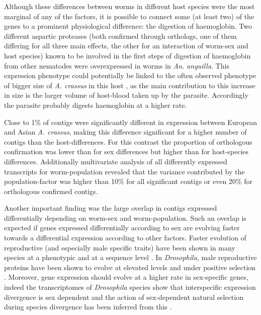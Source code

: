 Although these differences between worms in different host species
were the most marginal of any of the factors, it is possible to
connect some (at least two) of the genes to a prominent physiological
difference: the digestion of haemoglobin. Two different aspartic
proteases (both confirmed through orthologs, one of them differing for
all three main effects, the other for an interaction of worm-sex and
host species) known to be involved in the first steps of digestion of
haemoglobin from other nematodes \cite{pmid12782060} were
overexpressed in worms in \textit{An. anguilla}. This expression
phenotype could potentially be linked to the often observed phenotype
of bigger size of \textit{A. crassus} in this host
\cite{knopf_swimbladder_2006}, as the main contribution to this
increase in size is the larger volume of host-blood taken up by the
parasite. Accordingly the parasite probably digests haemoglobin at a
higher rate.

Close to 1\% of contigs were significantly different in expression
between European and Asian \textit{A. crassus}, making this difference
significant for a higher number of contigs than the
host-differences. For this contrast the proportion of orthologous
confirmation was lower than for sex differences but higher than for
host-species differences. Additionally multivariate analysis of all
differently expressed transcripts for worm-population revealed that
the variance contributed by the population-factor was higher than 10\%
for all significant contigs or even 20\% for orthologous confirmed
contigs.

Another important finding was the large overlap in contigs expressed
differentially depending on worm-sex and worm-population. Such an
overlap is expected if genes expressed differentially according to sex
are evolving faster towards a differential expression according to
other factors. Faster evolution of reproductive (and especially male
specific traits) have been shown in many species at a phenotypic and
at a sequence level \cite{pmid15795858}. In \textit{Drosophila}, male
reproductive proteins have been shown to evolve at elevated levels and
under positive selection \cite{pmid11404480}. Moreover, gene
expression should evolve at a higher rate in sex-specific genes,
indeed the transcriptomes of \textit{Drosophila} species show that
interspecific expression divergence is sex dependent and the action of
sex-dependent natural selection during species divergence has been
inferred from this \cite{pmid15034135,pmid19720861}.

